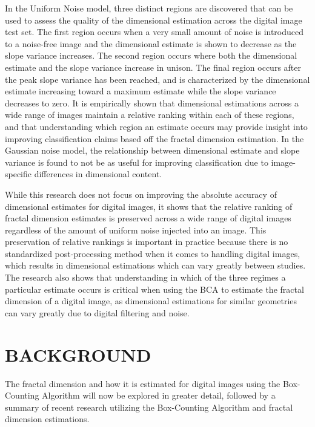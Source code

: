 \documentclass[12pt, oneside]{book}
\begin{document}
In the Uniform Noise model, three distinct regions are discovered that can be used to assess the quality of the dimensional estimation across the digital image test set.  The first region occurs when a very small amount of noise is introduced to a noise-free image and the dimensional estimate is shown to decrease as the slope variance increases.  The second region occurs where both the dimensional estimate and the slope variance increase in unison.  The final region occurs after the peak slope variance has been reached, and is characterized by the dimensional estimate increasing toward a maximum estimate while the slope variance decreases to zero.  It is empirically shown that dimensional estimations across a wide range of images maintain a relative ranking within each of these regions, and that understanding which region an estimate occurs may provide insight into improving classification claims based off the fractal dimension estimation.  In the Gaussian noise model, the relationship between dimensional estimate and slope variance is found to not be as useful for improving classification due to image-specific differences in dimensional content. 

While this research does not focus on improving the absolute accuracy of dimensional estimates for digital images, it shows that the relative ranking of fractal dimension estimates is preserved across a wide range of digital images regardless of the amount of uniform noise injected into an image.  This preservation of relative rankings is important in practice because there is no standardized post-processing method when it comes to handling digital images, which results in dimensional estimations which can vary greatly between studies. The research also shows that understanding in which of the three regimes a particular estimate occurs is critical when using the BCA to estimate the fractal dimension of a digital image, as dimensional estimations for similar geometries can vary greatly due to digital filtering and noise.  

% 
%
\chapter{\textbf{BACKGROUND}}
The fractal dimension and how it is estimated for digital images using the Box-Counting Algorithm will now be explored in greater detail, followed by a summary of recent research utilizing the Box-Counting Algorithm and fractal dimension estimations.
\end{document}

